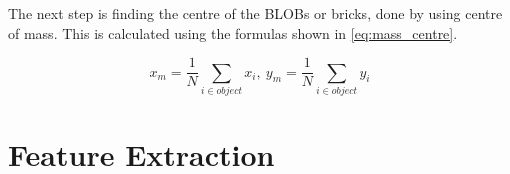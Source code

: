 The next step is finding the centre of the BLOBs or bricks, done by using centre of mass. This is calculated using the formulas shown in \autoref{eq:mass_centre}.

\begin{equation}\label{eq:mass_centre}
	x_m = \frac{1}{N}\sum_{i \in object}x_i, ~y_m= \frac{1}{N}\sum_{i \in object}y_i 
\end{equation}



\section{Feature Extraction}
